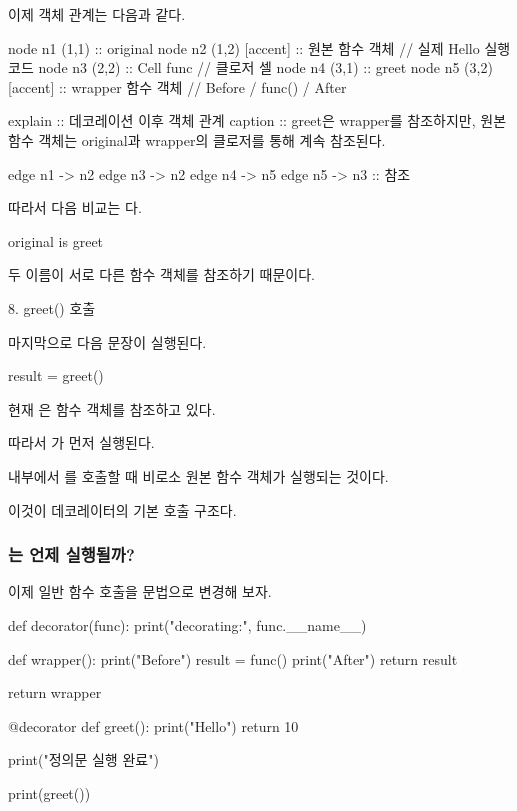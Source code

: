 이제 객체 관계는 다음과 같다.

\begin{dhkgraph}[uniform]
node n1 (1,1) :: original
node n2 (1,2) [accent] :: 원본 함수 객체 // 실제 Hello 실행 코드
node n3 (2,2) :: Cell func // 클로저 셀
node n4 (3,1) :: greet
node n5 (3,2) [accent] :: wrapper 함수 객체 // Before / func() / After

explain :: 데코레이션 이후 객체 관계
caption :: greet은 wrapper를 참조하지만, 원본 함수 객체는 original과 wrapper의 클로저를 통해 계속 참조된다.

edge n1 -> n2
edge n3 -> n2
edge n4 -> n5
edge n5 -> n3 :: 참조
\end{dhkgraph}

따라서 다음 비교는 다.

\begin{dhkcode}
original is greet
\end{dhkcode}

두 이름이 서로 다른 함수 객체를 참조하기 때문이다.

\begin{dhknote}
\begin{dhksmry}[centered]
8. greet() 호출
\end{dhksmry}
\end{dhknote}

마지막으로 다음 문장이 실행된다.

\begin{dhkcode}
result = greet()
\end{dhkcode}

현재 은  함수 객체를 참조하고 있다.

따라서 가 먼저 실행된다.

 내부에서 를 호출할 때 비로소 원본 함수 객체가 실행되는 것이다.

이것이 데코레이터의 기본 호출 구조다.

\subsubsection{는 언제 실행될까?}

이제 일반 함수 호출을  문법으로 변경해 보자.

\begin{dhkcode}
def decorator(func):
    print("decorating:", func.__name__)

    def wrapper():
        print("Before")
        result = func()
        print("After")
        return result

    return wrapper


@decorator
def greet():
    print("Hello")
    return 10


print("정의문 실행 완료")

print(greet())
\end{dhkcode}

